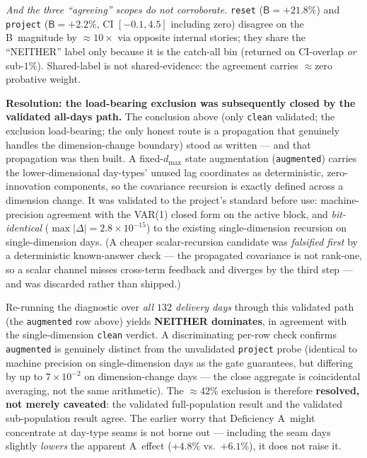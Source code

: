 \documentclass[11pt]{article}
\newcommand{\defA}{\textsf{A}}
\newcommand{\defB}{\textsf{B}}
\begin{document}
\emph{And the three ``agreeing'' scopes do not corroborate.}
\texttt{reset} ($\defB=+21.8\%$) and \texttt{project}
($\defB=+2.2\%$, CI $[-0.1,4.5]$ including zero) disagree on the \defB\
magnitude by ${\approx}10\times$ via opposite internal stories; they
share the ``NEITHER'' label only because it is the catch-all bin
(returned on CI-overlap \emph{or} sub-$1\%$). Shared-label is not
shared-evidence: the agreement carries ${\approx}$zero probative
weight.

\noindent\textbf{Resolution: the load-bearing exclusion was
subsequently closed by the validated all-days path.} The conclusion
above (only \texttt{clean} validated; the exclusion load-bearing; the
only honest route is a propagation that genuinely handles the
dimension-change boundary) stood as written --- and that propagation
was then built. A fixed-$d_{\max}$ state augmentation
(\texttt{augmented}) carries the lower-dimensional day-types' unused
lag coordinates as deterministic, zero-innovation components, so the
covariance recursion is exactly defined across a dimension change. It
was validated to the project's standard before use: machine-precision
agreement with the VAR(1) closed form on the active block, and
\emph{bit-identical} ($\max|\Delta|=2.8\times10^{-15}$) to the
existing single-dimension recursion on single-dimension days. (A
cheaper scalar-recursion candidate was \emph{falsified first} by a
deterministic known-answer check --- the propagated covariance is not
rank-one, so a scalar channel misses cross-term feedback and diverges
by the third step --- and was discarded rather than shipped.)

Re-running the diagnostic over \emph{all $132$ delivery days} through
this validated path (the \texttt{augmented} row above) yields
\textbf{NEITHER dominates}, in agreement with the single-dimension
\texttt{clean} verdict. A discriminating per-row check confirms
\texttt{augmented} is genuinely distinct from the unvalidated
\texttt{project} probe (identical to machine precision on
single-dimension days as the gate guarantees, but differing by up to
$7\times10^{-2}$ on dimension-change days --- the close aggregate is
coincidental averaging, not the same arithmetic). The
${\approx}42\%$ exclusion is therefore \textbf{resolved, not merely
caveated}: the validated full-population result and the validated
sub-population result agree. The earlier worry that Deficiency \defA\
might concentrate at day-type seams is not borne out --- including the
seam days slightly \emph{lowers} the apparent \defA\ effect
($+4.8\%$ vs.\ $+6.1\%$), it does not raise it.
\end{document}
